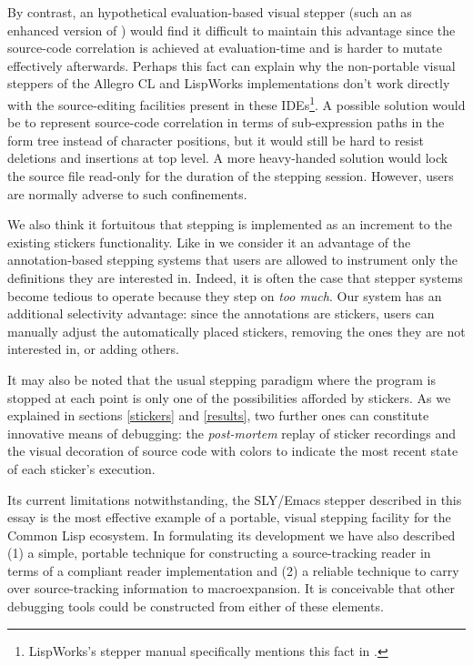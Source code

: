 \documentclass[sigconf]{acmart}
\begin{document}
By contrast, an hypothetical evaluation-based visual stepper (such an
as enhanced version of \cite{bourguignon}) would find it difficult to
maintain this advantage since the source-code correlation is achieved
at evaluation-time and is harder to mutate effectively afterwards.
Perhaps this fact can explain why the non-portable visual steppers of
the Allegro CL and LispWorks implementations don't work directly with
the source-editing facilities present in these
IDEs\footnote{LispWorks's stepper manual specifically mentions this
  fact in \cite{lispworks-stepper}.}.  A possible solution would be to
represent source-code correlation in terms of sub-expression paths in
the form tree instead of character positions, but it would still be
hard to resist deletions and insertions at top level.  A more
heavy-handed solution would lock the source file read-only for the
duration of the stepping session.  However, users are normally adverse
to such confinements.

We also think it fortuitous that stepping is implemented as an
increment to the existing stickers functionality.  Like in
\cite{annotation-based} we consider it an advantage of the
annotation-based stepping systems that users are allowed to instrument
only the definitions they are interested in.  Indeed, it is often the
case that stepper systems become tedious to operate because they step
on \emph{too much}.  Our system has an additional selectivity
advantage: since the annotations are stickers, users can manually
adjust the automatically placed stickers, removing the ones they are
not interested in, or adding others.

It may also be noted that the usual stepping paradigm where the
program is stopped at each point is only one of the possibilities
afforded by stickers.  As we explained in sections \ref{stickers} and
\ref{results}, two further ones can constitute innovative means of
debugging: the \emph{post-mortem} replay of sticker recordings and the
visual decoration of source code with colors to indicate the most
recent state of each sticker's execution.

Its current limitations notwithstanding, the SLY/Emacs stepper
described in this essay is the most effective example of a portable,
visual stepping facility for the Common Lisp ecosystem.  In
formulating its development we have also described (1) a simple,
portable technique for constructing a source-tracking reader in terms
of a compliant reader implementation and (2) a reliable technique to
carry over source-tracking information to macroexpansion.  It is
conceivable that other debugging tools could be constructed from
either of these elements.
\end{document}
